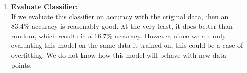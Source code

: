 \documentclass[letterpaper,12pt]{article}
\begin{document}
\begin{enumerate}
\item \textbf{Evaluate Classifier:} \\
If we evaluate this classifier on accuracy with the original data, then an $83.4\%$ accuracy is reasonably good. At the very least, it does better than random, which results in a $16.7\%$ accuracy. However, since we are only evaluating this model on the same data it trained on, this could be a case of overfitting. We do not know how this model will behave with new data points.
\end{enumerate}
\end{document}
